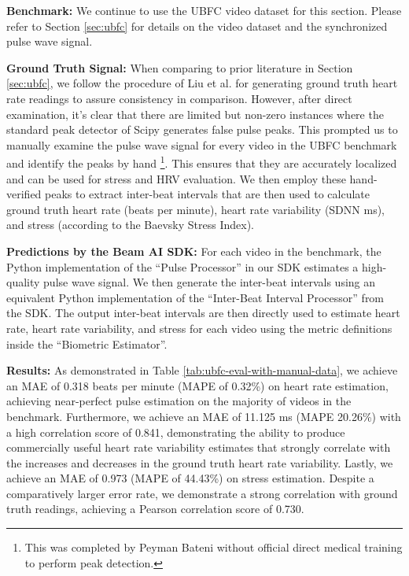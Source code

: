 \documentclass{article}
\begin{document}
\textbf{Benchmark:} We continue to use the UBFC \cite{Bobbia17_UBFC} video dataset for this section. Please refer to Section \ref{sec:ubfc} for details on the video dataset and the synchronized pulse wave signal.

\textbf{Ground Truth Signal:} When comparing to prior literature in Section \ref{sec:ubfc}, we follow the procedure of Liu et al. \cite{EfficientPhys_Liu2021} for generating ground truth heart rate readings to assure consistency in comparison. However, after direct examination, it's clear that there are limited but non-zero instances where the standard peak detector of Scipy \cite{2020SciPy-NMeth} generates false pulse peaks. This prompted us to manually examine the pulse wave signal for every video in the UBFC benchmark and identify the peaks by hand \footnote{This was completed by Peyman Bateni without official direct medical training to perform peak detection.}. This ensures that they are accurately localized and can be used for stress and HRV evaluation. We then employ these hand-verified peaks to extract inter-beat intervals that are then used to calculate ground truth heart rate (beats per minute), heart rate variability (SDNN ms), and stress (according to the Baevsky Stress Index).

\textbf{Predictions by the Beam AI SDK:} For each video in the benchmark, the Python implementation of the ``Pulse Processor'' in our SDK estimates a high-quality pulse wave signal. We then generate the inter-beat intervals using an equivalent Python implementation of the  ``Inter-Beat Interval Processor'' from the SDK. The output inter-beat intervals are then directly used to estimate heart rate, heart rate variability, and stress for each video using the metric definitions inside the ``Biometric Estimator''.

\textbf{Results:} As demonstrated in Table \ref{tab:ubfc-eval-with-manual-data}, we achieve an MAE of 0.318 beats per minute (MAPE of 0.32\%) on heart rate estimation, achieving near-perfect pulse estimation on the majority of videos in the benchmark. Furthermore, we achieve an MAE of 11.125 ms (MAPE 20.26\%) with a high correlation score of 0.841, demonstrating the ability to produce commercially useful heart rate variability estimates that strongly correlate with the increases and decreases in the ground truth heart rate variability. Lastly, we achieve an MAE of 0.973 (MAPE of 44.43\%) on stress estimation. Despite a comparatively larger error rate, we demonstrate a strong correlation with ground truth readings, achieving a Pearson correlation score of 0.730.
\end{document}
